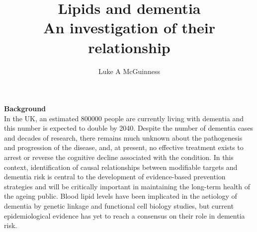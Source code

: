 \documentclass[a4paper, nobind]{templates/ociamthesis}
\title{Lipids and dementia\\
An investigation of their relationship}
\author{Luke A McGuinness}
\begin{document}
\setlength{\textbaselineskip}{22pt plus2pt}

\setlength{\frontmatterbaselineskip}{17pt plus1pt minus1pt}

\setlength{\abstractseparatelineskip}{13pt plus1pt minus1pt}
\setlength{\abstractseparateparskip}{0pt plus 1pt}

\setlength{\parskip}{2pt plus 1pt}


\setlength{\baselineskip}{\textbaselineskip}



\setcounter{secnumdepth}{2}
\setcounter{tocdepth}{2}


\begin{abstractseparate}
  \textbf{Background}\\
  In the UK, an estimated 800000 people are currently living with dementia and this number is expected to double
  by 2040. Despite the number of dementia cases and decades of research, there remains much unknown about
  the pathogenesis and progression of the disease, and, at present, no effective treatment exists to arrest or
  reverse the cognitive decline associated with the condition. In this context, identification of causal relationships
  between modifiable targets and dementia risk is central to the development of evidence-based prevention
  strategies and will be critically important in maintaining the long-term health of the ageing public. Blood lipid
  levels have been implicated in the aetiology of dementia by genetic linkage and functional cell biology studies,
  but current epidemiological evidence has yet to reach a consensus on their role in dementia risk.
\end{abstractseparate}
\end{document}
